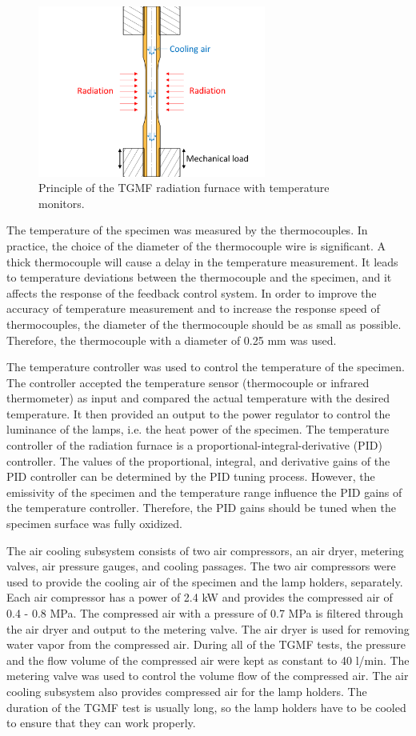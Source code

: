 \documentclass[preprint,5p,twocolumn,10pt,sort&compress]{elsarticle}
\begin{document}
\begin{figure}[!ht]
    \centering
    \includegraphics[width=7.5cm]{cooling.png}
    \caption{Principle of the TGMF radiation furnace with temperature monitors.}
    \label{Fig:cooling}
\end{figure}

The temperature of the specimen was measured by the thermocouples. In practice, the choice of the diameter of the thermocouple wire is significant. A thick thermocouple will cause a delay in the temperature measurement. It leads to temperature deviations between the thermocouple and the specimen, and it affects the response of the feedback control system. In order to improve the accuracy of temperature measurement and to increase the response speed of thermocouples, the diameter of the thermocouple should be as small as possible. Therefore, the thermocouple with a diameter of 0.25 mm was used.

The temperature controller was used to control the temperature of the specimen.
The controller accepted the temperature sensor (thermocouple or infrared thermometer) as input and compared the actual temperature with the desired temperature. It then provided an output to the power regulator to control the luminance of the lamps, i.e. the heat power of the specimen. 
The temperature controller of the radiation furnace is a proportional-integral-derivative (PID) controller. The values of the proportional, integral, and derivative gains of the PID controller can be determined by the PID tuning process.
However, the emissivity of the specimen and the temperature range influence the PID gains of the temperature controller. Therefore, the PID gains should be tuned when the specimen surface was fully oxidized.

The air cooling subsystem consists of two air compressors, an air dryer, metering valves, air pressure gauges, and cooling passages. 
The two air compressors were used to provide the cooling air of the specimen and the lamp holders, separately.
Each air compressor has a power of 2.4 kW and provides the compressed air of 0.4 - 0.8 MPa. The compressed air with a pressure of 0.7 MPa is filtered through the air dryer and output to the metering valve. The air dryer is used for removing water vapor from the compressed air.
During all of the TGMF tests, the pressure and the flow volume of the compressed air were kept as constant to 40 l/min. The metering valve was used to control the volume flow of the compressed air.
The air cooling subsystem also provides compressed air for the lamp holders.
The duration of the TGMF test is usually long, so the lamp holders have to be cooled to ensure that they can work properly.
\end{document}
